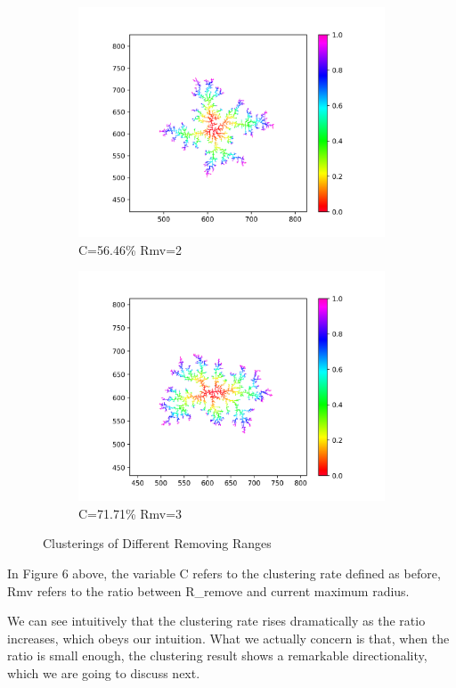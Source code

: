 \documentclass[10pt]{article}
\begin{document}
\begin{figure}[h]
\begin{subfigure}[b]{0.2\textwidth}
		\includegraphics[width=\textwidth]{Figure_10_2}
		\caption{C=56.46\% Rmv=2}
	\end{subfigure}
	\hfill
	\begin{subfigure}[b]{0.2\textwidth}
		\centering
		\includegraphics[width=\textwidth]{Figure_10_3}
		\caption{C=71.71\% Rmv=3}
	\end{subfigure}
	\caption{Clusterings of Different Removing Ranges}
\end{figure}

In Figure 6 above, the variable C refers to the clustering rate defined as before, Rmv refers to the ratio between R\_remove and current maximum radius.

We can see intuitively that the clustering rate rises dramatically as the ratio increases, which obeys our intuition. What we actually concern is that, when the ratio is small enough, the clustering result shows a remarkable directionality, which we are going to discuss next.
\end{document}
